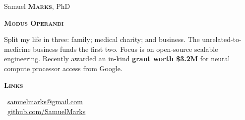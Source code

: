 \documentclass[11pt, a4paper]{article}
\newcommand{\headleft}[1]{\vspace*{3ex}\textsc{\textbf{#1}}\par%
    \vspace*{-1.5ex}\hrulefill\par\vspace*{0.7ex}}
\begin{document}
\setlength{\topskip}{0pt}
\setlength{\parindent}{0pt}
\setlength{\parskip}{0pt}
\setlength{\fboxsep}{0pt}
\pagestyle{empty}
\raggedbottom

\begin{minipage}[t]{0.33\textwidth} %
\colorbox{cvblue}{\begin{minipage}[t][5mm][t]{\textwidth}\null\hfill\null\end{minipage}}

\vspace{-.2ex} %
\colorbox{cvblue!90}{\color{white}  %
\textwidth\relax%
\begin{minipage}[t][293mm][t]{0.82\textwidth}
\raggedright
\vspace*{2.5ex}

\Large Samuel \textbf{\textsc{Marks}}, PhD \normalsize 


\vspace*{0.5ex} %

\headleft{Modus Operandi}
Split my life in three: family; medical charity; and business. The unrelated-to-medicine business funds the first two. Focus is on open-source scalable engineering. Recently awarded an in-kind \textbf{grant worth \$3.2M} for neural compute processor access from Google.

\headleft{Links}
\small %
\MVAt\ \href{mailto://samuelmarks@gmail.com}{\small samuelmarks@gmail.com} \\[0.4ex]
\Mundus\ \href{https://github.com/SamuelMarks}{github.com/SamuelMarks} \\[0.1ex]
\normalsize


\end{minipage}}
\end{minipage}
\end{document}
